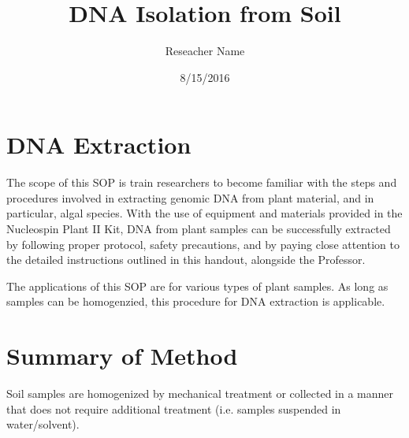 \documentclass[12pt]{../SOP3_alpha}
\title{DNA Isolation from Soil}
\date{8/15/2016}
\author{Reseacher Name}
\begin{document}


\maketitle

\section{DNA Extraction }

\NP The scope of this SOP is train researchers to become familiar with the steps and procedures involved in extracting genomic DNA from plant material, and in particular, algal species. With the use of equipment and materials provided in the Nucleospin Plant II Kit, DNA from plant samples can be successfully extracted by following proper protocol, safety precautions, and by paying close attention to the detailed instructions outlined in this handout, alongside the Professor. 

\NP The applications of this SOP are for various types of plant samples. As long as samples can be homogenzied, this procedure for DNA extraction is applicable. 

\section{Summary of Method}

Soil samples are homogenized by mechanical treatment or collected in a manner that does not require additional treatment (i.e. samples suspended in water/solvent). 

\end{document}
